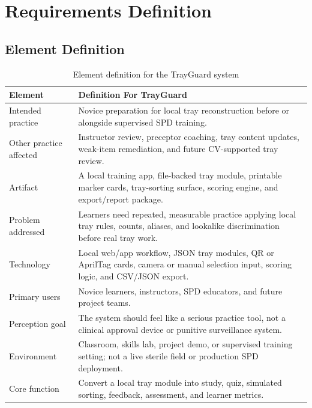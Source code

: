 \documentclass[10pt,a4paper]{article}
\begin{document}

\section{Requirements Definition}
\label{sec:requirements-definition}
\subsection{Element Definition}


\begin{table}[H]
\centering
\caption{Element definition for the TrayGuard system}
\label{tab:element-definition-for-the-trayguard-system}
\small\renewcommand{\arraystretch}{1.2}\setlength{\tabcolsep}{4pt}
\begin{tabularx}{\textwidth}{|>{\raggedright\arraybackslash}X|>{\raggedright\arraybackslash}X|}
\hline
Element & Definition For TrayGuard \\
\hline
Intended practice & Novice preparation for local tray reconstruction before or alongside supervised SPD training. \\
\hline
Other practice affected & Instructor review, preceptor coaching, tray content updates, weak-item remediation, and future CV-supported tray review. \\
\hline
Artifact & A local training app, file-backed tray module, printable marker cards, tray-sorting surface, scoring engine, and export/report package. \\
\hline
Problem addressed & Learners need repeated, measurable practice applying local tray rules, counts, aliases, and lookalike discrimination before real tray work. \\
\hline
Technology & Local web/app workflow, JSON tray modules, QR or AprilTag cards, camera or manual selection input, scoring logic, and CSV/JSON export. \\
\hline
Primary users & Novice learners, instructors, SPD educators, and future project teams. \\
\hline
Perception goal & The system should feel like a serious practice tool, not a clinical approval device or punitive surveillance system. \\
\hline
Environment & Classroom, skills lab, project demo, or supervised training setting; not a live sterile field or production SPD deployment. \\
\hline
Core function & Convert a local tray module into study, quiz, simulated sorting, feedback, assessment, and learner metrics. \\

\end{tabularx}
\end{table}
\end{document}
